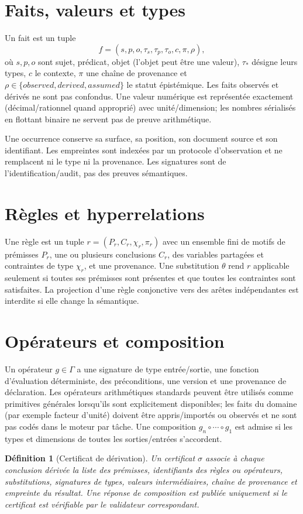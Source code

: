\documentclass[11pt,a4paper]{book}
\newtheorem{definition}{Définition}[chapter]
\begin{document}
\section{Faits, valeurs et types}
Un fait est un tuple
\[
f=(s,p,o,\tau_s,\tau_p,\tau_o,c,\pi,\rho),
\]
où $s,p,o$ sont sujet, prédicat, objet (l'objet peut être une valeur), $\tau_*$ désigne leurs types, $c$ le contexte, $\pi$ une chaîne de provenance et $\rho\in\{observed,derived,assumed\}$ le statut épistémique. Les faits observés et dérivés ne sont pas confondus. Une valeur numérique est représentée exactement (décimal/rationnel quand approprié) avec unité/dimension; les nombres sérialisés en flottant binaire ne servent pas de preuve arithmétique.

Une occurrence conserve sa surface, sa position, son document source et son identifiant. Les empreintes sont indexées par un protocole d'observation et ne remplacent ni le type ni la provenance. Les signatures sont de l'identification/audit, pas des preuves sémantiques. 

\section{Règles et hyperrelations}
Une règle est un tuple $r=(P_r,C_r,\chi_r,\pi_r)$ avec un ensemble fini de motifs de prémisses $P_r$, une ou plusieurs conclusions $C_r$, des variables partagées et contraintes de type $\chi_r$, et une provenance. Une substitution $\theta$ rend $r$ applicable seulement si toutes ses prémisses sont présentes et que toutes les contraintes sont satisfaites. La projection d'une règle conjonctive vers des arêtes indépendantes est interdite si elle change la sémantique.

\section{Opérateurs et composition}
Un opérateur $g\in\Gamma$ a une signature de type entrée/sortie, une fonction d'évaluation déterministe, des préconditions, une version et une provenance de déclaration. Les opérateurs arithmétiques standards peuvent être utilisés comme primitives générales lorsqu'ils sont explicitement disponibles; les faits du domaine (par exemple facteur d'unité) doivent être appris/importés ou observés et ne sont pas codés dans le moteur par tâche. Une composition $g_n\circ\cdots\circ g_1$ est admise si les types et dimensions de toutes les sorties/entrées s'accordent.

\begin{definition}[Certificat de dérivation]
Un certificat $\sigma$ associe à chaque conclusion dérivée la liste des prémisses, identifiants des règles ou opérateurs, substitutions, signatures de types, valeurs intermédiaires, chaîne de provenance et empreinte du résultat. Une réponse de composition est publiée uniquement si le certificat est vérifiable par le validateur correspondant.
\end{definition}
\end{document}
